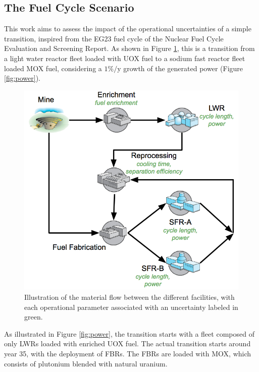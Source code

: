 \documentclass{anstrans}
\begin{document}
\subsection{The Fuel Cycle Scenario}
This work aims to assess the impact of the operational uncertainties of a simple
transition, inspired from the EG23 fuel cycle
of the Nuclear Fuel Cycle Evaluation and Screening Report\cite{ES}. As shown in Figure \ref{fig:cycle}, this is a
transition from a light water reactor fleet loaded with \gls{UOX} fuel to a
sodium fast reactor fleet loaded \gls{MOX} fuel, considering a $1\%/$y growth
of the generated power (Figure \ref{fig:power}).
\begin{figure}[ht] %
  \centering
  \includegraphics[scale=0.31]{cycle.png}
  \caption{Illustration of the material flow between the different facilities,
  with each operational parameter associated with an
  uncertainty labeled in green.}\label{fig:cycle}
\end{figure}

As illustrated in Figure \ref{fig:power}, the transition starts with a fleet
composed of only \glspl{LWR} loaded with enriched \gls{UOX} fuel.  The actual
transition starts around year 35, with the deployment of \glspl{FBR}. The \glspl{FBR} are loaded
with \gls{MOX}, which consists of plutonium blended with natural
uranium.
\end{document}
